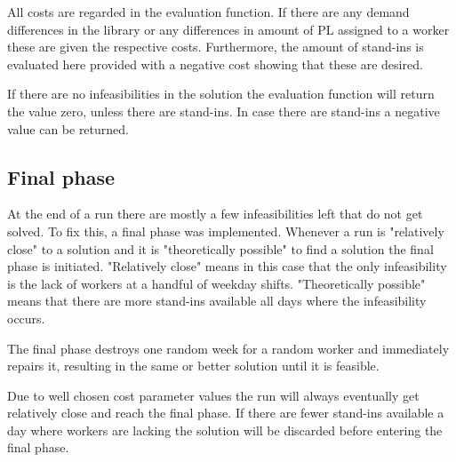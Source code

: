 All costs are regarded in the evaluation function. If there are any demand differences in the library or any differences in amount of PL assigned to a worker these are given the respective costs. Furthermore, the amount of stand-ins is evaluated here provided with a negative cost showing that these are desired.

If there are no infeasibilities in the solution the evaluation function will return the value zero, unless there are stand-ins. In case there are stand-ins a negative value can be returned. 
\subsection{Final phase}
At the end of a run there are mostly a few infeasibilities left that do not get solved. To fix this, a final phase was implemented. Whenever a run is "relatively close" to a solution and it is "theoretically possible" to find a solution the final phase is initiated. "Relatively close" means in this case that the only infeasibility is the lack of workers at a handful of weekday shifts. "Theoretically possible" means that there are more stand-ins available all days where the infeasibility occurs.

The final phase destroys one random week for a random worker and immediately repairs it, resulting in the same or better solution until it is feasible. %

Due to well chosen cost parameter values the run will always eventually get relatively close and reach the final phase. If there are fewer stand-ins available a day where workers are lacking the solution will be discarded before entering the final phase. 
